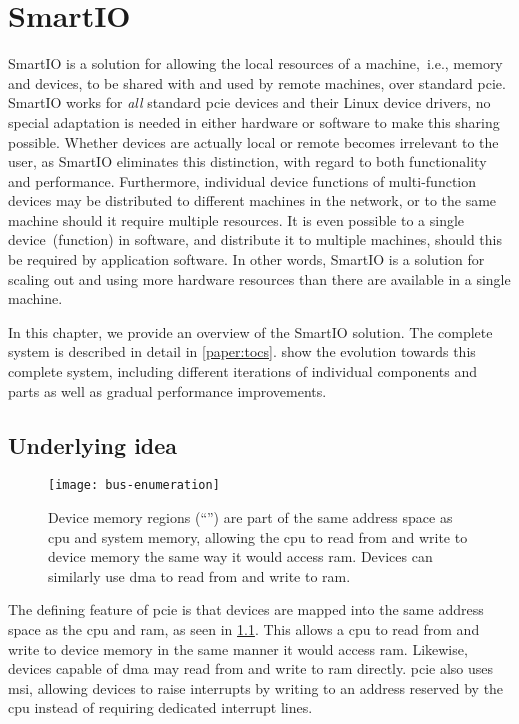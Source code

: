 \chapter{SmartIO}\label{chapter:smartio}
SmartIO is a solution for allowing the local resources of a machine,~i.e., memory and devices, to be shared with and used by remote machines, over standard \gls{pcie}.
%
SmartIO works for \emph{all} standard \gls{pcie} devices and their Linux device drivers, no special adaptation is needed in either hardware or software to make this sharing possible.
%
Whether devices are actually local or remote becomes irrelevant to the user, as SmartIO eliminates this distinction, with regard to both functionality and performance.
%
Furthermore, individual device functions of multi-function devices may be distributed to different machines in the network, or to the same machine should it require multiple resources.
%
It is even possible to  a single device~(function) in software, and distribute it to multiple machines, should this be required by application software.
%
In other words, SmartIO is a solution for scaling out and using more hardware resources than there are available in a single machine.


In this chapter, we provide an overview of the SmartIO solution.
%
The complete system is described in detail in \cref{paper:tocs}.
%
 show the evolution towards this complete system, including different iterations of individual components and parts as well as gradual performance improvements.


\section{Underlying idea}\label{sec:idea}
\begin{figure}
    \centering
    \texttt{[image: bus-enumeration]}
    \caption[Devices are part of the same address space as the  and system memory]
    {Device memory regions (``'') are part of the same address space as \acrshort{cpu} and system memory, allowing
    the \gls{cpu} to read from and write to device memory the same way it would access \acrshort{ram}. Devices can similarly use \gls{dma} to read from and write to \acrshort{ram}.}
    \label{fig:bus-enumeration}
\end{figure}
The defining feature of \gls{pcie} is that devices are mapped into the same address space as the \gls{cpu} and \gls{ram}, as seen in \cref{fig:bus-enumeration}.
%
This allows a \gls{cpu} to read from and write to device memory in the same manner it would access \gls{ram}.
%
Likewise, devices capable of \gls{dma} may read from and write to \gls{ram} directly.
%
\Gls{pcie} also uses \gls{msi}, allowing devices to raise interrupts by writing to an address reserved by the \gls{cpu} instead of requiring dedicated interrupt lines.



